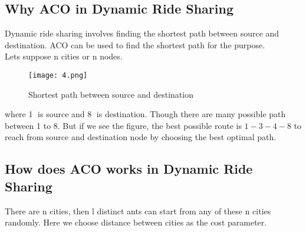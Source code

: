 \documentclass[11pt]{article}
\begin{document}
\subsection{Why ACO in Dynamic Ride Sharing}
Dynamic ride sharing involves finding the shortest path between source and destination. ACO can be used to find the shortest path for the purpose.\\
Lets suppose n cities or n nodes.
 
\begin{figure}[H]
\centering
\texttt{[image: 4.png]}
\caption{Shortest path between source and destination}
\label{fig:4}
\end{figure}
where \textcircled{1} is source and \textcircled{8} is destination. Though there are many possible path between 1 to 8. But if we see the figure, the best possible route is $1-3-4-8$ to reach from source and destination node by choosing the best optimal path.

\subsection{How does ACO works in Dynamic Ride Sharing}
There are n cities, then l distinct ants can start from any of these n cities randomly. Here we choose distance between cities as the cost parameter.
\end{document}
